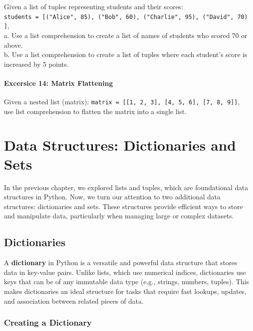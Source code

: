 \documentclass[
  letterpaper,
  DIV=11,
  numbers=noendperiod]{scrreprt}
\begin{document}
Given a list of tuples representing students and their scores:\\
\texttt{students\ =\ {[}("Alice",\ 85),\ ("Bob",\ 60),\ ("Charlie",\ 95),\ ("David",\ 70){]}},\\
a. Use a list comprehension to create a list of names of students who
scored 70 or above.\\
b. Use a list comprehension to create a list of tuples where each
student's score is increased by 5 points.

\hypertarget{excersice-14-matrix-flattening}{%
\subsubsection{Excersice 14: Matrix
Flattening}\label{excersice-14-matrix-flattening}}

Given a nested list (matrix):
\texttt{matrix\ =\ {[}{[}1,\ 2,\ 3{]},\ {[}4,\ 5,\ 6{]},\ {[}7,\ 8,\ 9{]}{]}},
use list comprehension to flatten the matrix into a single list.


\hypertarget{sec-data2}{%
\chapter{Data Structures: Dictionaries and Sets}\label{sec-data2}}

In the previous chapter, we explored lists and tuples, which are
foundational data structures in Python. Now, we turn our attention to
two additional data structures: dictionaries and sets. These structures
provide efficient ways to store and manipulate data, particularly when
managing large or complex datasets.

\hypertarget{dictionaries}{%
\section{Dictionaries}\label{dictionaries}}

A \textbf{dictionary} in Python is a versatile and powerful data
structure that stores data in key-value pairs. Unlike lists, which use
numerical indices, dictionaries use keys that can be of any immutable
data type (e.g., strings, numbers, tuples). This makes dictionaries an
ideal structure for tasks that require fast lookups, updates, and
association between related pieces of data.

\hypertarget{creating-a-dictionary}{%
\subsection{Creating a Dictionary}\label{creating-a-dictionary}}
\end{document}
